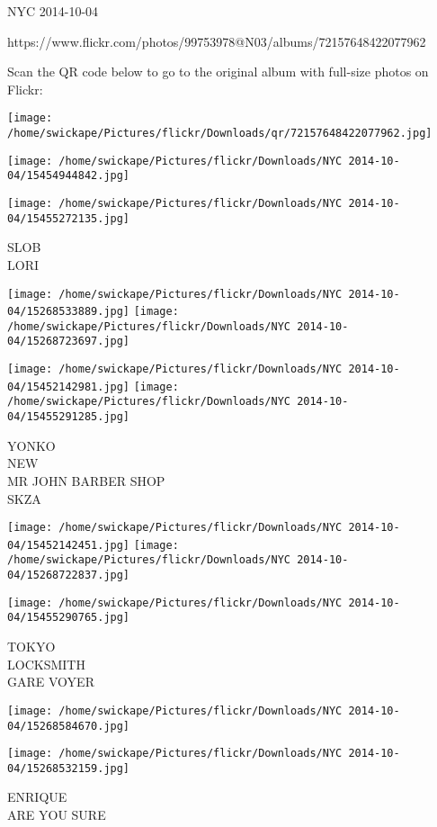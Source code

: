 \documentclass[10pt,letterpaper]{article}
\begin{document}
NYC 2014-10-04

https://www.flickr.com/photos/99753978@N03/albums/72157648422077962

Scan the QR code below to go to the original album with full-size photos on Flickr:

\texttt{[image: /home/swickape/Pictures/flickr/Downloads/qr/72157648422077962.jpg]}
\pagebreak

\texttt{[image: /home/swickape/Pictures/flickr/Downloads/NYC 2014-10-04/15454944842.jpg]}

\vspace{0.25in}
\texttt{[image: /home/swickape/Pictures/flickr/Downloads/NYC 2014-10-04/15455272135.jpg]}

SLOB\\
LORI
\pagebreak

\texttt{[image: /home/swickape/Pictures/flickr/Downloads/NYC 2014-10-04/15268533889.jpg]}
\texttt{[image: /home/swickape/Pictures/flickr/Downloads/NYC 2014-10-04/15268723697.jpg]}

\texttt{[image: /home/swickape/Pictures/flickr/Downloads/NYC 2014-10-04/15452142981.jpg]}
\texttt{[image: /home/swickape/Pictures/flickr/Downloads/NYC 2014-10-04/15455291285.jpg]}

YONKO\\
NEW\\
MR JOHN BARBER SHOP\\
SKZA
\pagebreak

\texttt{[image: /home/swickape/Pictures/flickr/Downloads/NYC 2014-10-04/15452142451.jpg]}
\texttt{[image: /home/swickape/Pictures/flickr/Downloads/NYC 2014-10-04/15268722837.jpg]}

\texttt{[image: /home/swickape/Pictures/flickr/Downloads/NYC 2014-10-04/15455290765.jpg]}

TOKYO\\
LOCKSMITH\\
GARE VOYER
\pagebreak

\texttt{[image: /home/swickape/Pictures/flickr/Downloads/NYC 2014-10-04/15268584670.jpg]}

\vspace{0.25in}
\texttt{[image: /home/swickape/Pictures/flickr/Downloads/NYC 2014-10-04/15268532159.jpg]}

ENRIQUE\\
ARE YOU SURE
\pagebreak
\end{document}
